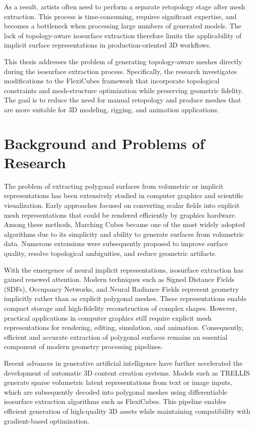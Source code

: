 \documentclass[../main.tex]{subfiles}
\begin{document}
As a result, artists often need to perform a separate retopology stage after mesh extraction. This process is time-consuming, requires significant expertise, and becomes a bottleneck when processing large numbers of generated models. The lack of topology-aware isosurface extraction therefore limits the applicability of implicit surface representations in production-oriented 3D workflows.

This thesis addresses the problem of generating topology-aware meshes directly during the isosurface extraction process. Specifically, the research investigates modifications to the FlexiCubes framework that incorporate topological constraints and mesh-structure optimization while preserving geometric fidelity. The goal is to reduce the need for manual retopology and produce meshes that are more suitable for 3D modeling, rigging, and animation applications.


\section{Background and Problems of Research}
\label{sec:giaiphap}

The problem of extracting polygonal surfaces from volumetric or implicit representations has been extensively studied in computer graphics and scientific visualization. Early approaches focused on converting scalar fields into explicit mesh representations that could be rendered efficiently by graphics hardware. Among these methods, Marching Cubes became one of the most widely adopted algorithms due to its simplicity and ability to generate surfaces from volumetric data. Numerous extensions were subsequently proposed to improve surface quality, resolve topological ambiguities, and reduce geometric artifacts.

With the emergence of neural implicit representations, isosurface extraction has gained renewed attention. Modern techniques such as Signed Distance Fields (SDFs), Occupancy Networks, and Neural Radiance Fields represent geometry implicitly rather than as explicit polygonal meshes. These representations enable compact storage and high-fidelity reconstruction of complex shapes. However, practical applications in computer graphics still require explicit mesh representations for rendering, editing, simulation, and animation. Consequently, efficient and accurate extraction of polygonal surfaces remains an essential component of modern geometry processing pipelines.

Recent advances in generative artificial intelligence have further accelerated the development of automatic 3D content creation systems. Models such as TRELLIS generate sparse volumetric latent representations from text or image inputs, which are subsequently decoded into polygonal meshes using differentiable isosurface extraction algorithms such as FlexiCubes. This pipeline enables efficient generation of high-quality 3D assets while maintaining compatibility with gradient-based optimization.
\end{document}
